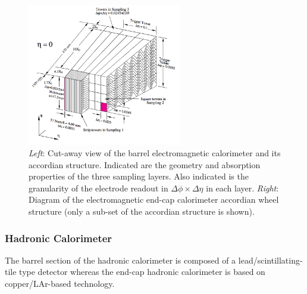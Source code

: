 \begin{figure}[!htb]
    \begin{center}
        \includegraphics[width=0.6\textwidth]{figures/chapter2/calorimeters/atlas_em_calo_barrel}
        \caption{
            \textit{Left}: Cut-away view of the barrel electromagnetic calorimeter and its accordian
                structure. Indicated are
                the geometry and absorption properties of the three sampling layers.
                Also indicated is the granularity of the electrode readout in $\Delta \phi \times \Delta \eta$
                in each layer.
            \textit{Right}: Diagram of the electromagnetic end-cap calorimeter accordian wheel structure
                (only a sub-set of the accordian structure is shown).
        }
        \label{fig:em_calo_section}
    \end{center}
\end{figure}

\FloatBarrier
\subsubsection{Hadronic Calorimeter}
\label{sec:calo_had}

The barrel section of the hadronic calorimeter is composed of a
lead/scintillating-tile type detector whereas the end-cap hadronic
calorimeter is based on copper/LAr-based technology.

